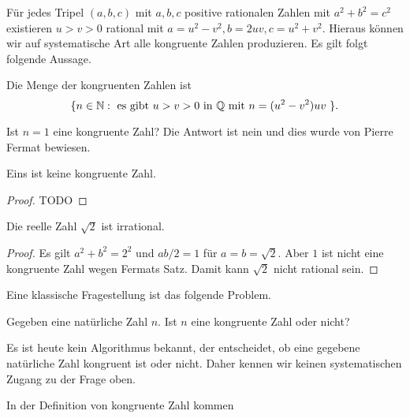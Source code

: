 Für jedes Tripel $(a,b,c)$ mit $a,b,c$ positive rationalen Zahlen mit
$a^2+b^2=c^2$ existieren $u>v>0$ rational mit $a =
u^2-v^2,b=2uv,c=u^2+v^2$. Hieraus können wir auf systematische Art
alle kongruente Zahlen produzieren. Es gilt folgt folgende Aussage.

\begin{lemma}
  Die Menge der kongruenten Zahlen ist
  $$
  \{ n \in {\mathbb{N}} : \text{ es gibt $u>v>0$ in ${\mathbb{Q}}$ mit $n=(u^2-v^2)uv$ }
  \}.
  $$
\end{lemma}


Ist $n=1$ eine kongruente Zahl? Die Antwort ist nein und dies wurde
von Pierre Fermat bewiesen.

\begin{satz}[Fermat]
  \label{satz:fermat}
  Eins  ist keine kongruente Zahl.
\end{satz}
\begin{proof}
  TODO
\end{proof}

\begin{korollar}
  Die reelle Zahl $\sqrt{2}$ ist irrational. 
\end{korollar}
\begin{proof}
  Es gilt $a^2+b^2=2^2$ und $ab/2=1$ für $a=b=\sqrt 2$. Aber $1$ ist
  nicht eine kongruente Zahl wegen Fermats Satz. Damit kann $\sqrt 2$
  nicht rational sein.
\end{proof}

Eine klassische Fragestellung ist das folgende Problem.

\begin{problem}
  Gegeben eine natürliche Zahl $n$. Ist $n$ eine kongruente Zahl oder
  nicht? 
\end{problem}

Es ist heute kein Algorithmus bekannt, der entscheidet, ob eine
gegebene natürliche Zahl kongruent ist oder nicht. Daher kennen wir
keinen systematischen Zugang zu der Frage oben.

In der Definition von kongruente Zahl kommen 

